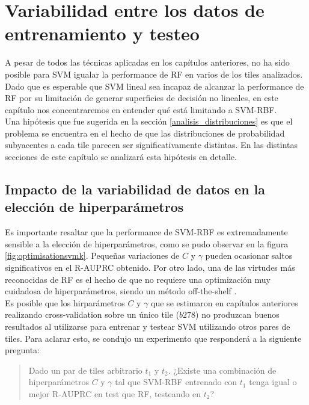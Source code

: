 \chapter{Variabilidad entre los datos de entrenamiento y testeo}
\label{variabilidad}
A pesar de todos las técnicas aplicadas en los capítulos anteriores, no ha sido posible para SVM igualar la performance de RF en varios de los tiles analizados. Dado que es esperable que SVM lineal sea incapaz de alcanzar la performance de RF por su limitación de generar superficies de decisión no lineales, en este capítulo nos concentraremos en entender qué está limitando a SVM-RBF. \\

Una hipótesis que fue sugerida en la sección \ref{analisis_distribuciones} es que el problema se encuentra en el hecho de que las distribuciones de probabilidad subyacentes a cada tile parecen ser significativamente distintas. En las distintas secciones de este capítulo se analizará esta hipótesis en detalle.

\section{Impacto de la variabilidad de datos en la elección de hiperparámetros }
\label{impacto}
Es importante resaltar que la performance de SVM-RBF es extremadamente sensible a la elección de hiperparámetros, como se pudo observar en la figura \ref{fig:optimisationsvmk}. Pequeñas variaciones de $C$ y $\gamma$ pueden ocasionar saltos significativos en el R-AUPRC obtenido. Por otro lado, una de las virtudes más reconocidas de RF es el hecho de que no requiere una optimización muy cuidadosa de hiperparámetros, siendo un método off-the-shelf \cite{offshelf}. \\

Es posible que los hirparámetros $C$ y $\gamma$ que se estimaron en capítulos anteriores realizando cross-validation sobre un único tile ($b278$) no produzcan buenos resultados al utilizarse para entrenar y testear SVM utilizando otros pares de tiles. Para aclarar esto, se condujo un experimento que responderá a la siguiente pregunta:

\begin{quotation}
Dado un par de tiles arbitrario $t_1$ y $t_2$. ¿Existe una combinación de hiperparámetros $C$ y $\gamma$ tal que SVM-RBF entrenado con $t_1$ tenga igual o mejor R-AUPRC en test que RF, testeando en $t_2$?
\end{quotation}

